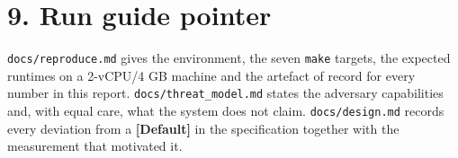 \documentclass[10pt,a4paper]{article}
\begin{document}
\section*{9. Run guide pointer}
\texttt{docs/\allowbreak{}reproduce.md} gives the environment, the seven \texttt{make} targets, the expected runtimes on a 2-\allowbreak{}vCPU/\allowbreak{}4 GB machine and the artefact of record for every number in this report. \texttt{docs/\allowbreak{}threat\_\allowbreak{}model.md} states the adversary capabilities and, with equal care, what the system does not claim. \texttt{docs/\allowbreak{}design.md} records every deviation from a \textbf{[Default]} in the specification together with the measurement that motivated it.
\end{document}
